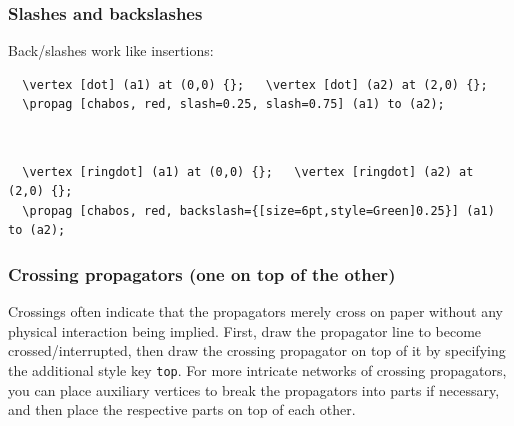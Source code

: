 \documentclass[10pt,letterpaper,twoside,notitlepage]{article}
\numberwithin{figure}{section}
\begin{document}
\subsubsection{Slashes and backslashes}
\label{sec:_feynmandiagrams_propagators_slashes}
%
\noindent
Back/slashes work like insertions:
\\
%
\begin{minipage}{0.83\linewidth}
\vercol\begin{verbatim}
  \vertex [dot] (a1) at (0,0) {};   \vertex [dot] (a2) at (2,0) {};
  \propag [chabos, red, slash=0.25, slash=0.75] (a1) to (a2);
\end{verbatim}\txcol
\end{minipage}
%
\begin{minipage}{0.16\linewidth}
\end{minipage}
\\
\begin{minipage}{0.83\linewidth}
\vercol\begin{verbatim}
  \vertex [ringdot] (a1) at (0,0) {};   \vertex [ringdot] (a2) at (2,0) {};
  \propag [chabos, red, backslash={[size=6pt,style=Green]0.25}] (a1) to (a2);
\end{verbatim}\txcol
\end{minipage}
%
\begin{minipage}{0.16\linewidth}
\end{minipage}

%
\newpage\subsubsection{Crossing propagators (one on top of the other)}
\label{sec:_feynmandiagrams_propagators_top}
%
\noindent
Crossings often indicate that the propagators merely cross on paper
without any physical interaction being implied.
First, draw the propagator line to become crossed/interrupted,
then draw the crossing propagator on top of it by specifying 
the additional style key \blucol\verb$top$\txcol.
For more intricate networks of crossing propagators, you can place auxiliary vertices 
to break the propagators into parts if necessary, 
and then place the respective parts on top of each other.
\end{document}

